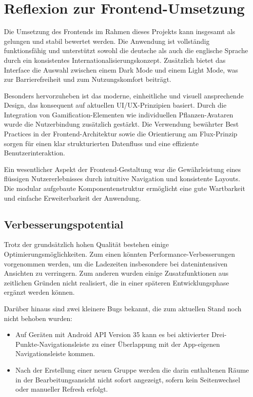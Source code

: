 \section{Reflexion zur Frontend-Umsetzung}

Die Umsetzung des Frontends im Rahmen dieses Projekts kann insgesamt als gelungen und stabil bewertet werden. Die Anwendung ist vollständig funktionsfähig und unterstützt sowohl die deutsche als auch die englische Sprache durch ein konsistentes Internationalisierungskonzept. Zusätzlich bietet das Interface die Auswahl zwischen einem Dark Mode und einem Light Mode, was zur Barrierefreiheit und zum Nutzungskomfort beiträgt.

Besonders hervorzuheben ist das moderne, einheitliche und visuell ansprechende Design, das konsequent auf aktuellen UI/UX-Prinzipien basiert. Durch die Integration von Gamification-Elementen wie individuellen Pflanzen-Avataren wurde die Nutzerbindung zusätzlich gestärkt. Die Verwendung bewährter Best Practices in der Frontend-Architektur sowie die Orientierung am Flux-Prinzip sorgen für einen klar strukturierten Datenfluss und eine effiziente Benutzerinteraktion.

Ein wesentlicher Aspekt der Frontend-Gestaltung war die Gewährleistung eines flüssigen Nutzererlebnisses durch intuitive Navigation und konsistente Layouts. Die modular aufgebaute Komponentenstruktur ermöglicht eine gute Wartbarkeit und einfache Erweiterbarkeit der Anwendung.

\subsection*{Verbesserungspotential}

Trotz der grundsätzlich hohen Qualität bestehen einige Optimierungsmöglichkeiten. Zum einen könnten Performance-Verbesserungen vorgenommen werden, um die Ladezeiten insbesondere bei datenintensiven Ansichten zu verringern. Zum anderen wurden einige Zusatzfunktionen aus zeitlichen Gründen nicht realisiert, die in einer späteren Entwicklungsphase ergänzt werden können.

Darüber hinaus sind zwei kleinere Bugs bekannt, die zum aktuellen Stand noch nicht behoben wurden:

\begin{itemize}
	\item Auf Geräten mit Android API Version 35 kann es bei aktivierter Drei-Punkte-Navigationsleiste zu einer Überlappung mit der App-eigenen Navigationsleiste kommen.
	\item Nach der Erstellung einer neuen Gruppe werden die darin enthaltenen Räume in der Bearbeitungsansicht nicht sofort angezeigt, sofern kein Seitenwechsel oder manueller Refresh erfolgt.
\end{itemize}

